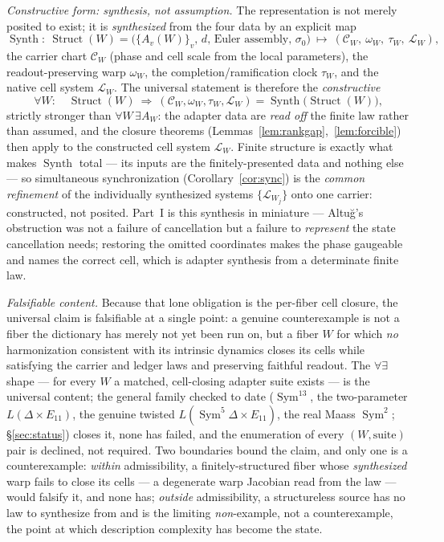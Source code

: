 \documentclass[11pt]{article}
\theoremstyle{definition}
\newcommand{\Sym}{\operatorname{Sym}}
\begin{document}
\emph{Constructive form: synthesis, not assumption.} The representation is not merely posited to exist; it is
\emph{synthesized} from the four data by an explicit map
\[
  \operatorname{Synth}:\ \operatorname{Struct}(W)=\big(\{A_v(W)\}_v,\,d,\,\text{Euler assembly},\,\sigma_0\big)
  \ \longmapsto\ (\mathcal C_W,\ \omega_W,\ \tau_W,\ \mathcal L_W),
\]
the carrier chart $\mathcal C_W$ (phase and cell scale from the local parameters), the readout-preserving warp
$\omega_W$, the completion/ramification clock $\tau_W$, and the native cell system $\mathcal L_W$. The universal
statement is therefore the \emph{constructive}
\[
  \forall W:\quad \operatorname{Struct}(W)\ \Longrightarrow\ (\mathcal C_W,\omega_W,\tau_W,\mathcal L_W)
  =\operatorname{Synth}\big(\operatorname{Struct}(W)\big),
\]
strictly stronger than $\forall W\,\exists A_W$: the adapter data are \emph{read off} the finite law rather than
assumed, and the closure theorems (Lemmas~\ref{lem:rankgap},~\ref{lem:forcible}) then apply to the constructed
cell system $\mathcal L_W$. Finite structure is exactly what makes $\operatorname{Synth}$ total --- its inputs are
the finitely-presented data and nothing else --- so simultaneous synchronization (Corollary~\ref{cor:sync}) is the
\emph{common refinement} of the individually synthesized systems $\{\mathcal L_{W_j}\}$ onto one carrier:
constructed, not posited. Part~I is this synthesis in miniature --- Altu\u{g}'s obstruction was not a failure of
cancellation but a failure to \emph{represent} the state cancellation needs; restoring the omitted coordinates
makes the phase gaugeable and names the correct cell, which is adapter synthesis from a determinate finite law.

\emph{Falsifiable content.} Because that lone obligation is the per-fiber cell closure, the universal claim is
falsifiable at a single point: a genuine counterexample is not a fiber the dictionary has merely not yet been run
on, but a fiber $W$ for which \emph{no} harmonization consistent with its intrinsic dynamics closes its cells
while satisfying the carrier and ledger laws and preserving faithful readout. The $\forall\exists$ shape --- for
every $W$ a matched, cell-closing adapter suite exists --- is the universal content; the general family checked to
date ($\Sym^{13}$, the two-parameter $L(\Delta\times E_{11})$, the genuine twisted $L(\Sym^5\Delta\times E_{11})$, the real Maass $\Sym^2$; \S\ref{sec:status})
closes it, none has failed, and the enumeration of every $(W,\text{suite})$ pair is declined, not required. Two boundaries bound the claim, and only one is a counterexample: \emph{within} admissibility, a finitely-structured fiber whose \emph{synthesized} warp fails to close its cells --- a degenerate warp Jacobian read from the law --- would falsify it, and none has; \emph{outside} admissibility, a structureless source has no law to synthesize from and is the limiting \emph{non}-example, not a counterexample, the point at which description complexity has become the state.
\end{document}

